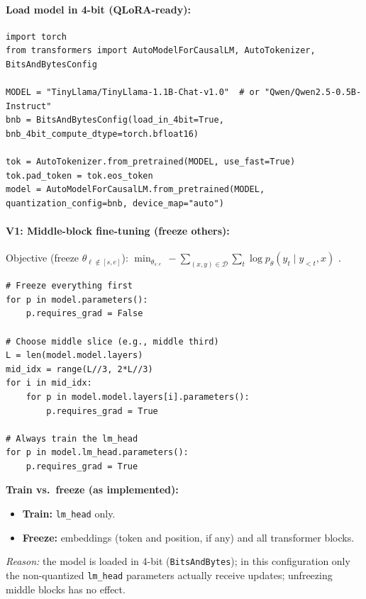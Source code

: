 \documentclass[11pt]{article}
\begin{document}
\paragraph{Load model in 4-bit (QLoRA-ready):}
\begin{lstlisting}[style=py]
import torch
from transformers import AutoModelForCausalLM, AutoTokenizer, BitsAndBytesConfig

MODEL = "TinyLlama/TinyLlama-1.1B-Chat-v1.0"  # or "Qwen/Qwen2.5-0.5B-Instruct"
bnb = BitsAndBytesConfig(load_in_4bit=True, bnb_4bit_compute_dtype=torch.bfloat16)

tok = AutoTokenizer.from_pretrained(MODEL, use_fast=True)
tok.pad_token = tok.eos_token
model = AutoModelForCausalLM.from_pretrained(MODEL, quantization_config=bnb, device_map="auto")
\end{lstlisting}

\paragraph{V1: Middle-block fine-tuning (freeze others):}
Objective (freeze $\theta_{\ell\notin[s,e]}$): $\displaystyle \min_{\theta_{s:e}}\, -\sum_{(x,y)\in\mathcal{D}}\sum_t\log p_\theta(y_t\mid y_{<t},x)$ \cite{brown2020gpt3,bishop2006prml}.
\begin{lstlisting}[style=py]
# Freeze everything first
for p in model.parameters():
    p.requires_grad = False

# Choose middle slice (e.g., middle third)
L = len(model.model.layers)
mid_idx = range(L//3, 2*L//3)
for i in mid_idx:
    for p in model.model.layers[i].parameters():
        p.requires_grad = True

# Always train the lm_head
for p in model.lm_head.parameters():
    p.requires_grad = True
\end{lstlisting}

\noindent\textbf{Train vs.\ freeze (as implemented):}
\begin{itemize}
  \item \textbf{Train:} \texttt{lm\_head} only.
  \item \textbf{Freeze:} embeddings (token and position, if any) and all transformer blocks.
\end{itemize}
\emph{Reason:} the model is loaded in 4-bit (\texttt{BitsAndBytes}); in this configuration only the non-quantized \texttt{lm\_head} parameters actually receive updates; unfreezing middle blocks has no effect.
\end{document}

